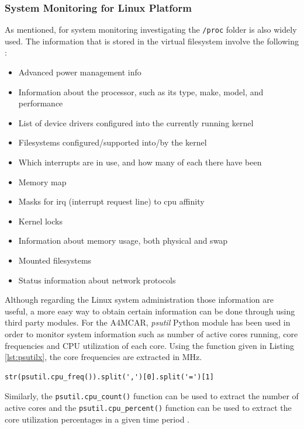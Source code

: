 \subsubsection{System Monitoring for Linux Platform}
As mentioned, for system monitoring investigating the \texttt{/proc} folder is also widely used. The information that is stored in the virtual filesystem involve the following \cite{linuxproc}:
\begin{itemize}
	\item Advanced power management info
	\item Information about the processor, such as its type, make, model, and performance
 	\item  List of device drivers configured into the currently running kernel
 	\item Filesystems configured/supported into/by the kernel
 	\item Which interrupts are in use, and how many of each there have been
 	\item Memory map
 	\item Masks for irq (interrupt request line) to cpu affinity
 	\item Kernel locks
 	\item Information about memory usage, both physical and swap
 	\item Mounted filesystems
 	\item Status information about network protocols
\end{itemize}

Although regarding the Linux system administration those information are useful, a more easy way to obtain certain information can be done through using third party modules. For the A4MCAR, \textit{psutil} Python module has been used in order to monitor system information such as number of active cores running, core frequencies and CPU utilization of each core. 
Using the function given in Listing \ref{lst:psutilx}, the core frequencies are extracted in MHz.
\begin{lstlisting}[caption={Using psutil to get CPU frequencies},label={lst:psutilx},style=python]
	str(psutil.cpu_freq()).split(',')[0].split('=')[1]
\end{lstlisting}
Similarly, the \texttt{psutil.cpu\texttt{\_}count()} function can be used to extract the number of active cores and the \texttt{psutil.cpu\texttt{\_}percent()} function can be used to extract the core utilization percentages in a given time period \cite{psutil}. 

